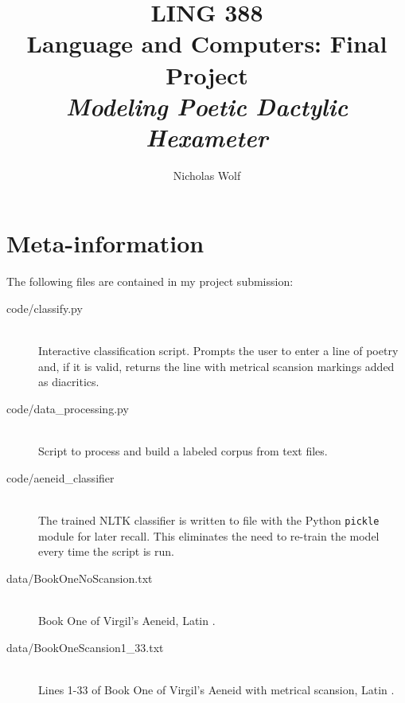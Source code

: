 \documentclass[12pt]{article}
\title{\textbf{LING 388} \\ Language and Computers: Final Project \\ \emph{Modeling Poetic Dactylic Hexameter}}
\author{Nicholas Wolf}
\begin{document}
\maketitle


\section*{Meta-information}
The following files are contained in my project submission:
\begin{description}
\item[code/classify.py] \hfill \\
Interactive classification script. Prompts the user to enter a line of poetry and, if it is valid, returns the line with metrical scansion markings added as diacritics. 
\item[code/data\_processing.py] \hfill \\
Script to process and build a labeled corpus from text files.
\item[code/aeneid\_classifier] \hfill \\
The trained NLTK classifier is written to file with the Python \texttt{pickle} module for later recall. This eliminates the need to re-train the model every time the script is run. 
\item[data/BookOneNoScansion.txt] \hfill \\
Book One of Virgil's Aeneid, Latin \cite{Virgil}.
\item[data/BookOneScansion1\_33.txt] \hfill \\
Lines 1-33 of Book One of Virgil's Aeneid with metrical scansion, Latin \cite{Rodde}.
\end{description}
\end{document}
